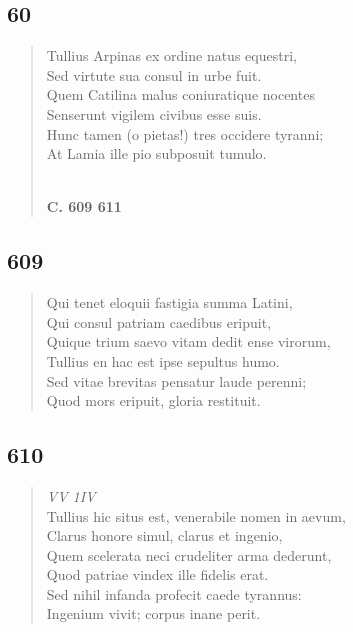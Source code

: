 \documentclass[11pt, a4paper]{report}
\begin{document}
            \subsection*{60}
      \begin{verse}
      Tullius Arpinas ex ordine natus equestri, \\ Sed virtute sua consul in urbe fuit. \\ Quem Catilina malus coniuratique nocentes \\ Senserunt vigilem civibus esse suis. \\ Hunc tamen (o pietas!) tres occidere tyranni; \\ At Lamia ille pio subposuit tumulo. \\ 
        ﻿\pagebreak 
     \marginpar{[89]} \begin{center} \textbf{C. 609 611} \end{center}
      \end{verse}
  
            \subsection*{609}
      \begin{verse}
      Qui tenet eloquii fastigia summa Latini, \\ Qui consul patriam caedibus eripuit, \\ Quique trium saevo vitam dedit ense virorum, \\ Tullius en hac est ipse sepultus humo. \\ Sed vitae brevitas pensatur laude perenni; \\ Quod mors eripuit, gloria restituit. \\ 
      \end{verse}
  
            \subsection*{610}
      \begin{verse}
      \textit{VV 1IV} \\ Tullius hic situs est, venerabile nomen in aevum, \\ Clarus honore simul, clarus et ingenio, \\ Quem scelerata neci crudeliter arma dederunt, \\ Quod patriae vindex ille fidelis erat. \\ Sed nihil infanda profecit caede tyrannus: \\ Ingenium vivit; corpus inane perit. \\ 
      \end{verse}
  
\end{document}
